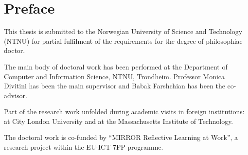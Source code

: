 \chapter*{Preface}

This thesis is submitted to the Norwegian University of Science and
Technology (NTNU) for partial fulfilment of the requirements for the
degree of philosophiae doctor.

The main body of doctoral work has been performed at the Department of
Computer and Information Science, NTNU, Trondheim. Professor Monica
Divitini has been the main supervisor and Babak Farshchian has been the
co-advisor.

Part of the research work unfolded during academic visits in foreign
institutions: at City London University and at the Massachusetts
Institute of Technology.

The doctoral work is co-funded by ``MIRROR Reflective Learning at
Work'', a research project within the EU-ICT 7FP programme.
